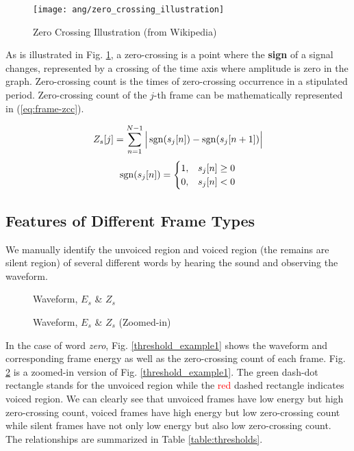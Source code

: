 \begin{figure}[H]
\centering
\texttt{[image: ang/zero\_crossing\_illustration]}
\caption{Zero Crossing Illustration (from Wikipedia)}
\label{zero_crossing_illustration}
\end{figure}

As is illustrated in Fig. \ref{zero_crossing_illustration}, a zero-crossing is a point where the \textbf{sign} of a signal changes, represented by a crossing of the time axis where amplitude is zero in the graph. Zero-crossing count is the times of zero-crossing occurrence in a stipulated period. Zero-crossing count of the $j$-th frame can be mathematically represented in (\ref{eq:frame-zcc}).

\begin{equation}
\label{eq:frame-zcc}
Z_s[j] = \sum_{n=1}^{N-1} \Big| \operatorname{sgn}(s_j[n]) - \operatorname{sgn}(s_j[n+1]) \Big|
\end{equation}
\begin{equation}
\operatorname{sgn}(s_j[n]) =
\begin{cases}
1, &s_j[n] \ge 0\\
0, &s_j[n] < 0
\end{cases}
\end{equation}


\subsection{Features of Different Frame Types}

We manually identify the unvoiced region and voiced region (the remains are silent region) of several different words by hearing the sound and observing the waveform.

\begin{figure}[H]
\begin{minipage}[t]{0.5\linewidth}
\centering
{}
\caption{Waveform, $E_s$ \& $Z_s$}
\label{threshold_example1}
\end{minipage}
\begin{minipage}[t]{0.5\linewidth}
\centering
{}
\caption{Waveform, $E_s$ \& $Z_s$ (Zoomed-in)}
\label{threshold_example2}
\end{minipage}
\end{figure}

In the case of word \textit{zero}, Fig. \ref{threshold_example1} shows the waveform and corresponding frame energy as well as the zero-crossing count of each frame. Fig. \ref{threshold_example2} is a zoomed-in version of Fig. \ref{threshold_example1}. The \textcolor{green_html}{green} dash-dot rectangle stands for the unvoiced region while the \textcolor{red}{red} dashed rectangle indicates voiced region. We can clearly see that unvoiced frames have low energy but high zero-crossing count, voiced frames have high energy but low zero-crossing count while silent frames have not only low energy but also low zero-crossing count. The relationships are summarized in Table \ref{table:thresholds}.

